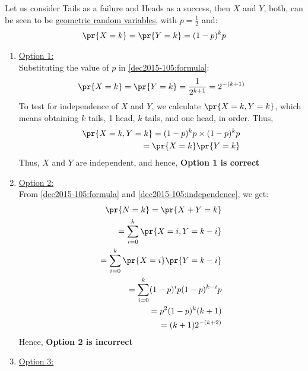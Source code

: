 Let us consider Tails as a failure and Heads as a success, then $X$ and $Y$, both, can be seen to be \underline{geometric random variables}, with $p = \frac{1}{2}$ and:
\begin{align}
    \pr{X = k} = \pr{Y = k} = (1-p)^k p  
    \label{dec2015-105:formula}
\end{align}
\begin{enumerate}
    \item \underline{Option 1:}\\
    
    Substituting the value of $p$ in \eqref{dec2015-105:formula}:
{\small
\begin{align}
    \pr{X = k} = \pr{Y = k} = \frac{1}{2^{k+1}} = 2^{-(k+1)}
\end{align}
}
To test for independence of $X$ and $Y$, we calculate $\pr{X = k, Y = k}$, which means obtaining $k$ tails, 1 head, $k$ tails, and one head, in order. Thus,
{\small
\begin{align}
    \pr{X = k,Y = k} = (1-p)^k p \times (1-p)^k p\\
    =\pr{X = k}\pr{Y = k}
    \label{dec2015-105:independence}
    \end{align}
    }
    Thus, $X$ and $Y$ are independent, and hence, \textbf{Option 1 is correct}\\
    \item \underline{Option 2:}\\
    
    From \eqref{dec2015-105:formula} and \eqref{dec2015-105:independence}, we get:
\begin{align}
    \pr{N = k} = \pr{X+Y = k}\\
    = \sum_{i=0}^k\pr{X = i, Y = k-i} \\
    = \sum_{i=0}^k\pr{X = i} \pr{Y = k-i}\\
    =\sum_{i=0}^k (1-p)^i p (1-p)^{k-i} p\\
    = p^2(1-p)^k (k+1)\\
    =(k+1) 2^{-(k+2)}
\end{align}
Hence, \textbf{Option 2 is incorrect}\\
 \item \underline{Option 3:}\\
 

\end{enumerate}
